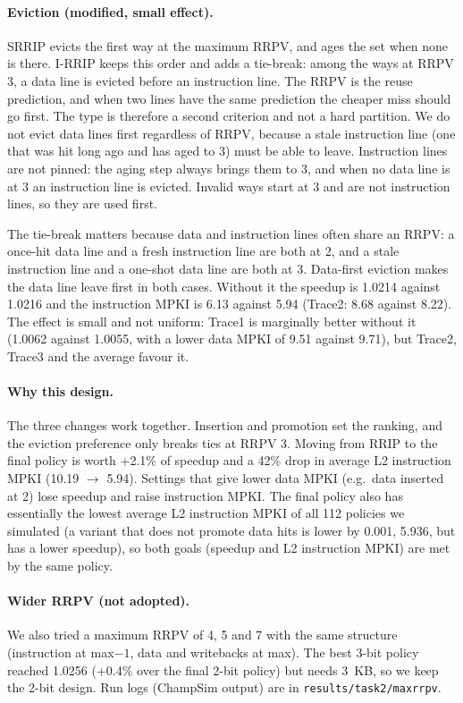 \documentclass[11pt,a4paper]{article}
\begin{document}
\paragraph{Eviction (modified, small effect).} SRRIP evicts the first way at the maximum RRPV, and ages the set when none
is there. I-RRIP keeps this order and adds a tie-break: among the ways at RRPV 3, a data line
is evicted before an instruction line. The RRPV is the reuse prediction, and when two lines have the same
prediction the cheaper miss should go first. The type is therefore a second criterion and not a
hard partition. We do not evict data lines first regardless of RRPV, because a stale instruction
line (one that was hit long ago and has aged to 3) must be able to leave. Instruction lines are
not pinned: the aging step always brings them to 3, and when no data line is at 3 an instruction line is
evicted. Invalid ways start at 3 and are not instruction lines, so they are used first.

The tie-break matters because data and instruction lines often share an RRPV: a once-hit data line and a fresh
instruction line are both at 2, and a stale instruction line and a one-shot data line are both at 3. Data-first
eviction makes the data line leave first in both cases. Without it the speedup is 1.0214 against 1.0216 and the
instruction MPKI is 6.13 against 5.94 (Trace2: 8.68 against 8.22). The effect is small and not uniform:
Trace1 is marginally better without it (1.0062 against 1.0055, with a lower data MPKI of 9.51 against 9.71),
but Trace2, Trace3 and the average favour it.

\paragraph{Why this design.} The three changes work together. Insertion and promotion set the
ranking, and the eviction preference only breaks ties at RRPV 3. Moving from RRIP to the final policy
is worth +2.1\% of speedup and a 42\% drop in average L2 instruction MPKI (10.19 $\to$ 5.94).
Settings that give lower data MPKI (e.g.\ data inserted at 2) lose speedup and raise
instruction MPKI. The final policy also has essentially the lowest average L2 instruction MPKI of all 112
policies we simulated (a variant that does not promote data hits is lower by 0.001, 5.936, but has a lower speedup),
so both goals (speedup and L2 instruction MPKI) are met by the same policy.

\paragraph{Wider RRPV (not adopted).} We also tried a maximum RRPV of 4, 5 and 7 with the same structure
(instruction at max$-1$, data and writebacks at max). The best 3-bit policy reached 1.0256 (+0.4\% over the final 2-bit policy) but needs 3~KB, so we keep the 2-bit design. Run logs (ChampSim output) are in \texttt{results/task2/maxrrpv}.
\end{document}
